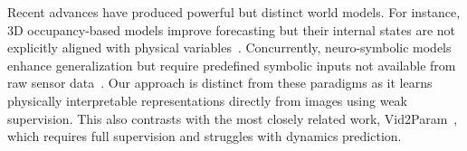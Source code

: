 \documentclass[sigconf]{acmart}
\begin{document}
Recent advances have produced powerful but distinct world models. For instance, 3D occupancy-based models improve forecasting but their internal states are not explicitly aligned with physical variables~\cite[]{zheng2024occworld,min2023uniworld,yan2024renderworld,zuo2024gaussianworld}. Concurrently, neuro-symbolic models enhance generalization but require predefined symbolic inputs not available from raw sensor data~\cite[]{balloch2023neuro,liang2024visualpredicator}. Our approach is distinct from these paradigms as it learns physically interpretable representations directly from images using weak supervision. This also contrasts with the most closely related work, Vid2Param~\cite[]{asenov2019vid2param}, which requires full supervision and struggles with dynamics prediction.
\end{document}
